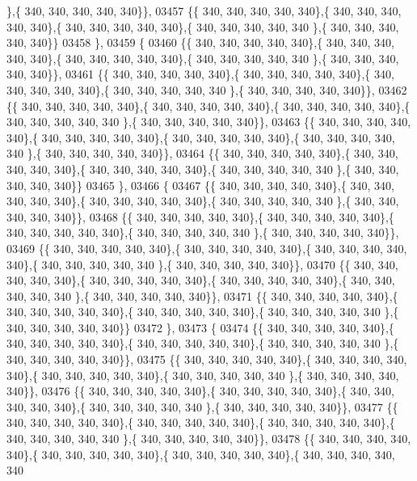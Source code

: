 \begin{DoxyCode}
      \},\{ 340, 340, 340, 340, 340\}\},
03457 \{\{ 340, 340, 340, 340, 340\},\{ 340, 340, 340, 340, 340\},\{ 340, 340, 340, 340, 340\},\{ 340, 340, 340, 340, 340
      \},\{ 340, 340, 340, 340, 340\}\}
03458 \},
03459 \{
03460 \{\{ 340, 340, 340, 340, 340\},\{ 340, 340, 340, 340, 340\},\{ 340, 340, 340, 340, 340\},\{ 340, 340, 340, 340, 340
      \},\{ 340, 340, 340, 340, 340\}\},
03461 \{\{ 340, 340, 340, 340, 340\},\{ 340, 340, 340, 340, 340\},\{ 340, 340, 340, 340, 340\},\{ 340, 340, 340, 340, 340
      \},\{ 340, 340, 340, 340, 340\}\},
03462 \{\{ 340, 340, 340, 340, 340\},\{ 340, 340, 340, 340, 340\},\{ 340, 340, 340, 340, 340\},\{ 340, 340, 340, 340, 340
      \},\{ 340, 340, 340, 340, 340\}\},
03463 \{\{ 340, 340, 340, 340, 340\},\{ 340, 340, 340, 340, 340\},\{ 340, 340, 340, 340, 340\},\{ 340, 340, 340, 340, 340
      \},\{ 340, 340, 340, 340, 340\}\},
03464 \{\{ 340, 340, 340, 340, 340\},\{ 340, 340, 340, 340, 340\},\{ 340, 340, 340, 340, 340\},\{ 340, 340, 340, 340, 340
      \},\{ 340, 340, 340, 340, 340\}\}
03465 \},
03466 \{
03467 \{\{ 340, 340, 340, 340, 340\},\{ 340, 340, 340, 340, 340\},\{ 340, 340, 340, 340, 340\},\{ 340, 340, 340, 340, 340
      \},\{ 340, 340, 340, 340, 340\}\},
03468 \{\{ 340, 340, 340, 340, 340\},\{ 340, 340, 340, 340, 340\},\{ 340, 340, 340, 340, 340\},\{ 340, 340, 340, 340, 340
      \},\{ 340, 340, 340, 340, 340\}\},
03469 \{\{ 340, 340, 340, 340, 340\},\{ 340, 340, 340, 340, 340\},\{ 340, 340, 340, 340, 340\},\{ 340, 340, 340, 340, 340
      \},\{ 340, 340, 340, 340, 340\}\},
03470 \{\{ 340, 340, 340, 340, 340\},\{ 340, 340, 340, 340, 340\},\{ 340, 340, 340, 340, 340\},\{ 340, 340, 340, 340, 340
      \},\{ 340, 340, 340, 340, 340\}\},
03471 \{\{ 340, 340, 340, 340, 340\},\{ 340, 340, 340, 340, 340\},\{ 340, 340, 340, 340, 340\},\{ 340, 340, 340, 340, 340
      \},\{ 340, 340, 340, 340, 340\}\}
03472 \},
03473 \{
03474 \{\{ 340, 340, 340, 340, 340\},\{ 340, 340, 340, 340, 340\},\{ 340, 340, 340, 340, 340\},\{ 340, 340, 340, 340, 340
      \},\{ 340, 340, 340, 340, 340\}\},
03475 \{\{ 340, 340, 340, 340, 340\},\{ 340, 340, 340, 340, 340\},\{ 340, 340, 340, 340, 340\},\{ 340, 340, 340, 340, 340
      \},\{ 340, 340, 340, 340, 340\}\},
03476 \{\{ 340, 340, 340, 340, 340\},\{ 340, 340, 340, 340, 340\},\{ 340, 340, 340, 340, 340\},\{ 340, 340, 340, 340, 340
      \},\{ 340, 340, 340, 340, 340\}\},
03477 \{\{ 340, 340, 340, 340, 340\},\{ 340, 340, 340, 340, 340\},\{ 340, 340, 340, 340, 340\},\{ 340, 340, 340, 340, 340
      \},\{ 340, 340, 340, 340, 340\}\},
03478 \{\{ 340, 340, 340, 340, 340\},\{ 340, 340, 340, 340, 340\},\{ 340, 340, 340, 340, 340\},\{ 340, 340, 340, 340, 340

\end{DoxyCode}
